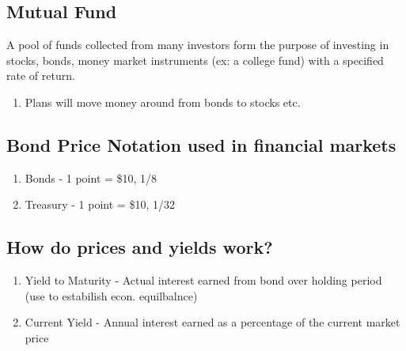 \documentclass{report} %
\begin{document}
\subsection*{Mutual Fund}
A pool of funds collected from many investors form the purpose of investing in stocks, bonds, money market instruments (ex: a college fund) with a specified rate of return.
\begin{enumerate}
    \item Plans will move money around from bonds to stocks etc.
\end{enumerate}


\subsection*{Bond Price Notation used in financial markets}
\begin{enumerate}
    \item Bonds - 1 point = \$10, 1/8
    \item Treasury - 1 point = \$10, 1/32 
\end{enumerate}

\subsection*{How do prices and yields work?}
\begin{enumerate}
    \item Yield to Maturity - Actual interest earned from bond over holding period (use to estabilish econ. equilbalnce)
    \item Current Yield - Annual interest earned as a percentage of the current market price
\end{enumerate}
\end{document}
